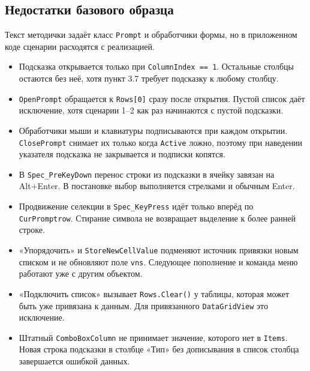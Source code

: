 \documentclass[a4paper,14pt]{extarticle}
\begin{document}
\subsection{Недостатки базового образца}
Текст методички задаёт класс \texttt{Prompt} и обработчики формы, но в приложенном коде сценарии расходятся с реализацией.
\begin{itemize}
\item Подсказка открывается только при \texttt{ColumnIndex == 1}. Остальные столбцы остаются без неё, хотя пункт 3.7 требует подсказку к любому столбцу.
\item \texttt{OpenPrompt} обращается к \texttt{Rows[0]} сразу после открытия. Пустой список даёт исключение, хотя сценарии 1--2 как раз начинаются с пустой подсказки.
\item Обработчики мыши и клавиатуры подписываются при каждом открытии. \texttt{ClosePrompt} снимает их только когда \texttt{Active} ложно, поэтому при наведении указателя подсказка не закрывается и подписки копятся.
\item В \texttt{Spec\_PreKeyDown} перенос строки из подсказки в ячейку завязан на Alt+Enter. В постановке выбор выполняется стрелками и обычным Enter.
\item Продвижение селекции в \texttt{Spec\_KeyPress} идёт только вперёд по \texttt{CurPromptrow}. Стирание символа не возвращает выделение к более ранней строке.
\item «Упорядочить» и \texttt{StoreNewCellValue} подменяют источник привязки новым списком и не обновляют поле \texttt{vns}. Следующее пополнение и команда меню работают уже с другим объектом.
\item «Подключить список» вызывает \texttt{Rows.Clear()} у таблицы, которая может быть уже привязана к данным. Для привязанного \texttt{DataGridView} это исключение.
\item Штатный \texttt{ComboBoxColumn} не принимает значение, которого нет в \texttt{Items}. Новая строка подсказки в столбце «Тип» без дописывания в список столбца завершается ошибкой данных.
\end{itemize}
\end{document}

